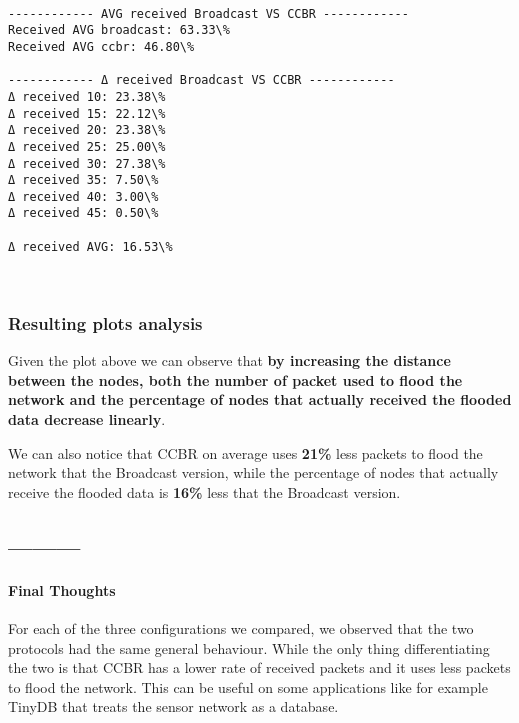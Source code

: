 \documentclass[11pt]{article}
\begin{document}
    \begin{center}
    \end{center}
    { \hspace*{\fill} \\}
    
    \begin{Verbatim}[commandchars=\\\{\}]
------------ AVG received Broadcast VS CCBR ------------
Received AVG broadcast: 63.33\%
Received AVG ccbr: 46.80\%

------------ Δ received Broadcast VS CCBR ------------
Δ received 10: 23.38\%
Δ received 15: 22.12\%
Δ received 20: 23.38\%
Δ received 25: 25.00\%
Δ received 30: 27.38\%
Δ received 35: 7.50\%
Δ received 40: 3.00\%
Δ received 45: 0.50\%

Δ received AVG: 16.53\%

    \end{Verbatim}

    \begin{center}
    \end{center}
    { \hspace*{\fill} \\}
    
    \hypertarget{resulting-plots-analysis}{%
\subsubsection{Resulting plots
analysis}\label{resulting-plots-analysis}}

Given the plot above we can observe that \textbf{by increasing the
distance between the nodes, both the number of packet used to flood the
network and the percentage of nodes that actually received the flooded
data decrease linearly}.

We can also notice that CCBR on average uses \textbf{21\%} less packets
to flood the network that the Broadcast version, while the percentage of
nodes that actually receive the flooded data is \textbf{16\%} less that
the Broadcast version.

\hypertarget{section}{%
\subsection{---------}\label{section}}

\hypertarget{final-thoughts}{%
\paragraph{Final Thoughts}\label{final-thoughts}}

For each of the three configurations we compared, we observed that the
two protocols had the same general behaviour. While the only thing
differentiating the two is that CCBR has a lower rate of received
packets and it uses less packets to flood the network. This can be
useful on some applications like for example TinyDB that treats the
sensor network as a database.


    
    
    
    
\end{document}
